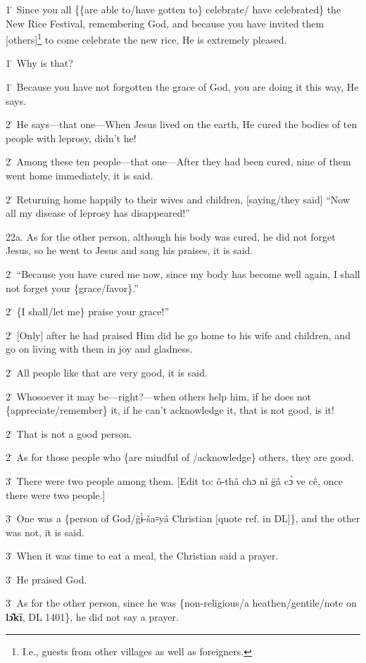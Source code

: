 1\. Since you all \{\{are able to/have gotten to\} celebrate/ have celebrated\}
the New Rice Festival, remembering God, and because you have invited them [others]\footnote{I.e., guests from other villages as well as foreigners.}
to come celebrate the new rice, He is extremely pleased.

1\. Why is that?

1\. Because you have not forgotten the grace of God, you are doing it this way,
He says.

2\. He says---that one---When Jesus lived on the earth, He cured the bodies of
ten people with leprosy, didn't he!

2\. Among these ten people---that one---After they had been cured, nine of them
went home immediately, it is said.

2\. Returning home happily to their wives and children, [saying/they said] ``Now
all my disease of leprosy has disappeared!''

22a. As for the other person, although his body was cured, he did not forget Jesus,
so he went to Jesus and sang his praises, it is said.

2\. ``Because you have cured me now, since my body has become well again, I shall
not forget your \{grace/favor\}.''

2\. \{I shall/let me\} praise your grace!''

2\. [Only] after he had praised Him did he go home to his wife and children, and
go on living with them in joy and gladness.

2\. All people like that are very good, it is said.

2\. Whosoever it may be---right?---when others help him, if he does not \{appreciate/remember\}
it, if he can't acknowledge it, that is not good, is it!

2\. That is not a good person.

2\. As for those people who \{are mindful of /acknowledge\} others, they are good.

3\. There were two people among them. [Edit to: ô-thâ chɔ nî g̈â cɔ̀ ve
cê, once there were two people.]

3\. One was a \{person of God/g̈ɨ̀-ša꞊yâ Christian [quote ref. in DL]\},
and the other was not, it is said.

3\. When it was time to eat a meal, the Christian said a prayer.

3\. He praised God.

3\. As for the other person, since he was \{non-religious/a heathen/gentile/note
on \textbf{lɔ̂kī}, DL 1401\}, he did not say a prayer.

